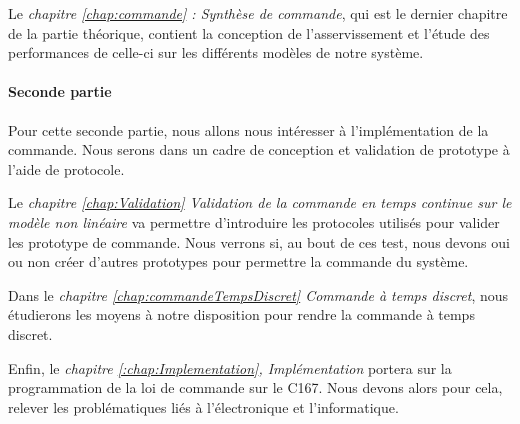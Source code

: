 Le \emph{chapitre \ref{chap:commande} : Synthèse de commande}, qui est le dernier chapitre de la partie théorique, contient la conception de l'asservissement et l'étude des performances de celle-ci sur les différents modèles de notre système.

\paragraph*{Seconde partie}
Pour cette seconde partie, nous allons nous intéresser à l'implémentation de la commande. Nous serons dans un cadre de conception et validation de prototype à l'aide de protocole.

Le \emph{chapitre \ref{chap:Validation} Validation de la commande en temps continue sur le modèle non linéaire} va permettre d'introduire les protocoles utilisés pour valider les prototype de commande. Nous verrons si, au bout de ces test, nous devons oui ou non créer d'autres prototypes pour permettre la commande du système.

Dans le \emph{chapitre \ref{chap:commandeTempsDiscret} Commande à temps discret}, nous étudierons les moyens à notre disposition pour rendre la commande à temps discret.

Enfin, le \emph{chapitre \ref{:chap:Implementation}, Implémentation} portera sur la programmation de la loi de commande sur le C167. Nous devons alors pour cela, relever les problématiques liés à l’électronique et l'informatique.



